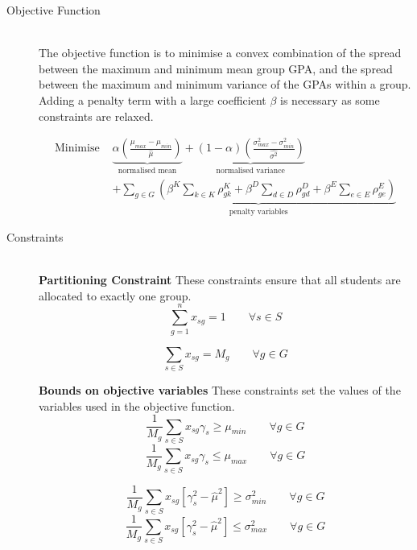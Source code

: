 \documentclass[12pt]{ORSNZ}
\begin{document}
\begin{description}
\item[Objective Function]\mbox{} \\
The objective function is to minimise a convex combination of the spread between the maximum and minimum mean group GPA, and the spread between the maximum and minimum variance of the GPAs within a group. Adding a penalty term with a large coefficient $\beta$ is necessary as some constraints are relaxed.

\begin{equation}\begin{split}
\mbox{Minimise }&
\underbrace{\alpha\left(\frac{\mu_{max} - \mu_{min}}{\hat{\mu}}\right)}_{\mbox{normalised mean}} 
+ \underbrace{(1-\alpha)\left(\frac{\sigma^2_{max} - \sigma^2_{min}}{\hat{\sigma^2}}\right)}_{\mbox{normalised variance}}
\\&+ \underbrace{\sum_{g \in G}\left(\beta^K\sum_{k \in K}\rho^K_{gk} 
    + \beta^D\sum_{d \in D}\rho^D_{gd} 
    + \beta^E\sum_{e \in E}\rho^E_{ge}\right)}_{\mbox{penalty variables}}
\end{split}\end{equation}

\item[Constraints]\mbox{} \\
\textbf{Partitioning Constraint} These constraints ensure that all students are allocated to exactly one group.
\begin{equation} \label{con1}
\sum_{g=1}^n x_{sg} =  1 \qquad \mbox{$\forall s \in S$}
\end{equation}

\begin{equation} \label{con2}
\sum_{s \in S} x_{sg} =  M_g \qquad \mbox{$\forall g \in G$}
\end{equation}

\textbf{Bounds on objective variables} These constraints set the values of the variables used in the objective function.
\begin{equation} \label{minu}
\frac{1}{M_g}\sum_{s \in S} x_{sg}\gamma_s \geq \mu_{min} \qquad \mbox{$\forall g \in G$}
\end{equation}
\begin{equation} \label{maxu}
\frac{1}{M_g}\sum_{s \in S} x_{sg}  \gamma_s \leq \mu_{max} \qquad \mbox{$\forall g \in G$}
\end{equation}

\begin{equation} \label{minv}
\frac{1}{M_g}\sum_{s \in S} x_{sg} [\gamma_s^2  - \hat{\mu}^2] \geq \sigma^2_{min} \qquad\mbox{$\forall g \in G$}
\end{equation}
\begin{equation} \label{maxv}
\frac{1}{M_g}\sum_{s \in S} x_{sg}[\gamma_s^2 - \hat{\mu}^2] \leq \sigma^2_{max} \qquad\mbox{$\forall g \in G$}
\end{equation}



\end{description}
\end{document}
